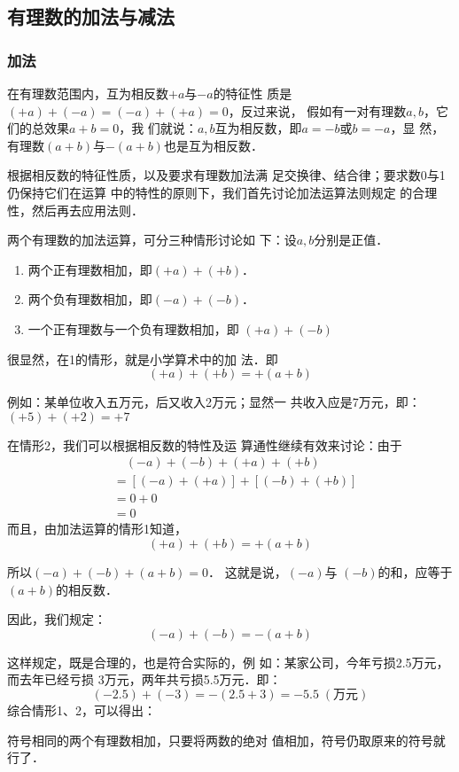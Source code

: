 \subsection{有理数的加法与减法}
\subsubsection{加法}

在有理数范围内，互为相反数$+a$与$-a$的特征性
质是$(+a) + (-a)=(-a) + (+a) = 0$，反过来说，
假如有一对有理数$a,  b$，它们的总效果$a+b= 0$，我
们就说：$a,  b$互为相反数，即$a=-b$或$b=-a$，显
然，有理数$(a + b)$与$-(a + b)$也是互为相反数．

根据相反数的特征性质，以及要求有理数加法满
足交换律、结合律；要求数0与1仍保持它们在运算
中的特性的原则下，我们首先讨论加法运算法则规定
的合理性，然后再去应用法则．

两个有理数的加法运算，可分三种情形讨论如
下：设$a,  b$分别是正值．
\begin{enumerate}
	\item 两个正有理数相加，即$(+ a)+(+b)$．
	\item 两个负有理数相加，即$(-a)+(-b)$．
	\item 一个正有理数与一个负有理数相加，即
	$(+a)+(-b)$
\end{enumerate}

很显然，在1的情形，就是小学算术中的加
法．即
\[(+a)+(+b)=+(a+b)\]

例如：某单位收入五万元，后又收入2万元；显然一
共收入应是7万元，即：$(+5)+(+2)=+7$

在情形2，我们可以根据相反数的特性及运
算通性继续有效来讨论：由于
\begin{align*}
&\quad (-a) +(-b) + (+a) + (+b)\\
&=[(-a)+(+a)]+[(-b)+(+b)]
\tag{加法交换、结合律}\\
&=0+0\tag{相反数的特性}\\
&=0\tag{零的运算}
\end{align*}
而且，由加法运算的情形1知道，
\[(+a)+(+b)=+(a+b)\]

所以$( - a) + (- b) + (a + b) = 0$．
这就是说，$( - a)$与
$(-b)$的和，应等于$(a + b)$的相反数．

因此，我们规定：
\[(-a)+(-b)=-(a+b)\]

这样规定，既是合理的，也是符合实际的，例
如：某家公司，今年亏损2.5万元，而去年已经亏损
3万元，两年共亏损5.5万元．即：
\[(-2. 5)+(-3)=-(2.5+3)=-5.5\; (\text{万元})\]
综合情形1、2，可以得出：
\begin{blk}{}
	符号相同的两个有理数相加，只要将两数的绝对
	值相加，符号仍取原来的符号就行了．
\end{blk}


